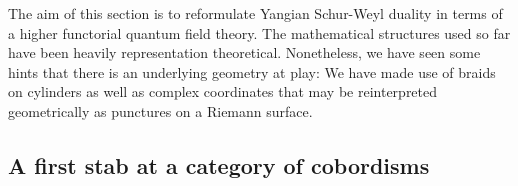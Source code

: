 \documentclass[11pt]{report}
\theoremstyle{definition}
\newtheorem{definition}[theorem]{Definition}
\theoremstyle{remark}
\theoremstyle{remark}
\renewcommand{\P}{\mathbb{P}}
\begin{document}
The aim of this section is to reformulate Yangian Schur-Weyl duality in terms of a higher functorial quantum field theory. The mathematical structures used so far have been heavily representation theoretical. Nonetheless, we have seen some hints that there is an underlying geometry at play: We have made use of braids on cylinders as well as complex coordinates that may be reinterpreted geometrically as punctures on a Riemann surface.

\subsection{A first stab at a category of cobordisms}

%
%
%
\end{document}
